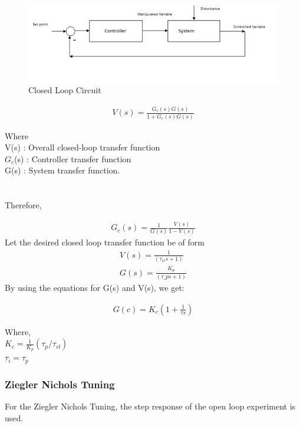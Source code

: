 \begin{figure}[h]
	\centering
		\includegraphics[scale = 20,width = 1\linewidth]{Vikas_self/report_tex/Closed Loop Circuit.jpg}
	\caption{Closed Loop Circuit}
\end{figure}

\begin{align}
V(s) = \frac {G_c(s) G(s)}{1+G_c(s) G(s)}
\end{align}

Where\\
V(s) : Overall closed-loop transfer function\\
$G_c$(s) : Controller transfer function\\
G(s) : System transfer function.\\ \\\\
Therefore,

\begin{align*}
G_c(s) = \frac 1{G(s)} \frac {V(s)}{1-V(s)}
\end{align*}
Let the desired closed loop transfer function be of form
\begin{align}
V(s)=\frac 1{(\tau_{cl}s+1)}\\
G(s)=\frac {K_p}{(\tau\_p s+1)}
\end{align}
By using the equations for G(s) and V(s), we get:

\begin{align}
G(c)=K_c(1 + \frac {1}{\tau s})
\end{align}

Where,\\
$K_c = \frac 1{K_p} (\tau_p / \tau_{cl} )$\\
$\tau_i = \tau_p$ \\
\subsubsection{Ziegler Nichols Tuning}
For the Ziegler Nichols Tuning, the step response of the open loop experiment is used.

